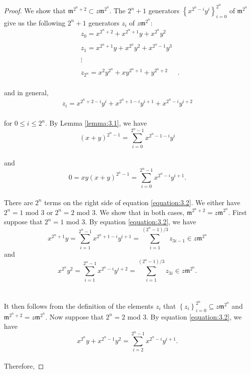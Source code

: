 \documentclass{amsart}
\theoremstyle{definition}
\theoremstyle{definition}
\numberwithin{equation}{section}
\theoremstyle{definition}
\begin{document}
{\begin{proof}
We show that $\mathfrak{m}^{2^n+2} \subset z \mathfrak{m}^{2^n}$. The $2^n+1$ generators $\left\{x^{2^n-i}y^i \right\}_{i=0}^{2^n}$ of $\mathfrak{m}^{2^n}$ give us the following $2^n+1$ generators $z_i$ of $z\mathfrak{m}^{2^n}$: \\
\begin{align*}
&z_0=x^{{2^n}+2}+x^{{2^n}+1}y+x^{2^n}y^2&
\\\\
&z_1=x^{2^n+1}y + x^{2^n}y^2 + x^{2^n-1}y^3&
\\\\
&\vdots& 
\\\\
&z_{2^n}=x^2 y^{2^{n}} + xy^{{2^{n}}+1} +y^{{2^{n}}+2}&.
\end{align*}
\text{}\\
and in general,
\begin{align*}
&z_i=x^{2^{n}+2-i}y^i+x^{2^{n}+1-i}y^{i+1}+x^{2^{n}-i}y^{i+2}&
\end{align*}
\text{}\\ for $0 \leq i \leq 2^n$. By Lemma \ref{lemma:3.1}, we have \\
\[
(x+y)^{2^n -1}=\sum\limits_{i=0}^{2^n -1} x^{2^n -1-i}y^i
\] \text{}\\
and \\
\begin{equation}\label{equation:3.2}
0 = xy(x+y)^{2^n -1} = \sum\limits_{i=0}^{2^n -1} x^{2^n-i}y^{i+1}.
\end{equation} \text{}\\
There are $2^n$ terms on the right side of equation \ref{equation:3.2}. We either have $2^n=1$ mod $3$ or $2^n=2$ mod $3$. We show that in both cases, $\mathfrak{m}^{2^n+2}=z \mathfrak{m}^{2^n}$. First suppose that $2^n=1$ mod $3$. By equation \ref{equation:3.2}, we have 
\[
x^{2^n+1}y=\sum\limits_{i=1}^{2^n -1} x^{2^n+1-i}y^{i+1} = \sum\limits_{i=1}^{(2^n -1)/3} z_{3i-1} \in z \mathfrak{m}^{2^n}
\] and 
\[
x^{2^n}y^2=\sum\limits_{i=1}^{2^n -1} x^{2^n-i}y^{i+2} = \sum\limits_{i=1}^{(2^n -1)/3} z_{3i} \in z \mathfrak{m}^{2^n}.
\] \text{}\\\\ It then follows from the definition of the elements $z_i$ that $\left\{z_i \right\}_{i=0}^{2^n} \subseteq z \mathfrak{m}^{2^n}$ and $\mathfrak{m}^{2^n+2}=z \mathfrak{m}^{2^n}$. Now suppose that $2^n=2$ mod $3$. By equation \ref{equation:3.2}, we have 
\[
x^{2^n}y + x^{2^n-1}y^2=\sum\limits_{i=2}^{2^n -1} x^{2^n-i}y^{i+1}.
\]\text{}\\ Therefore, 

\end{proof}}
\end{document}

